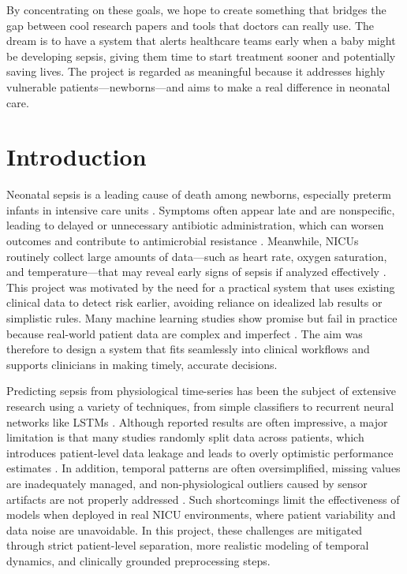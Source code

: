 \documentclass[conference]{IEEEtran}
\begin{document}
\begin{enumerate}
    By concentrating on these goals, we hope to create something that bridges the gap between cool research papers and tools that doctors can really use. The dream is to have a system that alerts healthcare teams early when a baby might be developing sepsis, giving them time to start treatment sooner and potentially saving lives. The project is regarded as meaningful because it addresses highly vulnerable patients—newborns—and aims to make a real difference in neonatal care.
\end{enumerate}
 

\section{Introduction}
Neonatal sepsis is a leading cause of death among newborns, especially preterm infants in intensive care units \cite{hero_monitoring,plos_ehr_sepsis}. Symptoms often appear late and are nonspecific, leading to delayed or unnecessary antibiotic administration, which can worsen outcomes and contribute to antimicrobial resistance \cite{vital_sign_ml}. Meanwhile, NICUs routinely collect large amounts of data—such as heart rate, oxygen saturation, and temperature—that may reveal early signs of sepsis if analyzed effectively  \cite{hero_monitoring}. This project was motivated by the need for a practical system that uses existing clinical data to detect risk earlier, avoiding reliance on idealized lab results or simplistic rules. Many machine learning studies show promise but fail in practice because real-world patient data are complex and imperfect  \cite{plos_ehr_sepsis,ehr_rnn_sepsis}. The aim was therefore to design a system that fits seamlessly into clinical workflows and supports clinicians in making timely, accurate decisions.



Predicting sepsis from physiological time-series has been the subject of extensive research using a variety of techniques, from simple classifiers to recurrent neural networks like LSTMs \cite{vital_sign_ml,ehr_rnn_sepsis}. Although reported results are often impressive, a major limitation is that many studies randomly split data across patients, which introduces patient-level data leakage and leads to overly optimistic performance estimates \cite{plos_ehr_sepsis}. In addition, temporal patterns are often oversimplified, missing values are inadequately managed, and non-physiological outliers caused by sensor artifacts are not properly addressed  \cite{cnn_psd_sepsis}. Such shortcomings limit the effectiveness of models when deployed in real NICU environments, where patient variability and data noise are unavoidable. In this project, these challenges are mitigated through strict patient-level separation, more realistic modeling of temporal dynamics, and clinically grounded preprocessing steps.
\end{document}
